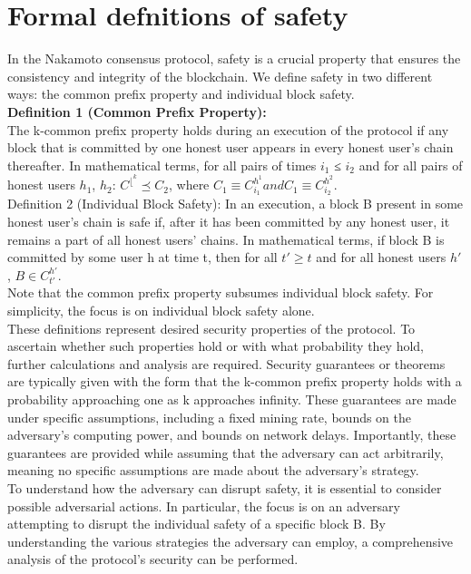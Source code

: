 \section{Formal defnitions of safety}
In the Nakamoto consensus protocol, safety is a crucial property that ensures the consistency and integrity of the blockchain. We define safety in two different ways: the common prefix property and individual block safety.\\
\textbf{Definition 1 (Common Prefix Property):}\\
The k-common prefix property holds during an execution of the protocol if any block that is committed by one honest user appears in every honest user's chain thereafter. In mathematical terms, for all pairs of times $i_{1}$ ≤ $i_{2}$ and for all pairs of honest users $h_{1}$, $h_{2}$:
$C^{⌊^{k}} ⪯ C_{2}$,
where $C_{1} ≡ C_{i_{1}}^{h^{1}} and C_{1} ≡ C_{i_{2}}^{h^{2}}.$\\
Definition 2 (Individual Block Safety):
In an execution, a block B present in some honest user's chain is safe if, after it has been committed by any honest user, it remains a part of all honest users' chains. In mathematical terms, if block B is committed by some user h at time t, then for all $t′ ≥ t$ and for all honest users $h′$, $B ∈ C_{t'}^{h′}$.\\
Note that the common prefix property subsumes individual block safety. For simplicity, the focus is on individual block safety alone.\\
These definitions represent desired security properties of the protocol. To ascertain whether such properties hold or with what probability they hold, further calculations and analysis are required. Security guarantees or theorems are typically given with the form that the k-common prefix property holds with a probability approaching one as k approaches infinity. These guarantees are made under specific assumptions, including a fixed mining rate, bounds on the adversary's computing power, and bounds on network delays. Importantly, these guarantees are provided while assuming that the adversary can act arbitrarily, meaning no specific assumptions are made about the adversary's strategy.\\
To understand how the adversary can disrupt safety, it is essential to consider possible adversarial actions. In particular, the focus is on an adversary attempting to disrupt the individual safety of a specific block B. By understanding the various strategies the adversary can employ, a comprehensive analysis of the protocol's security can be performed.
